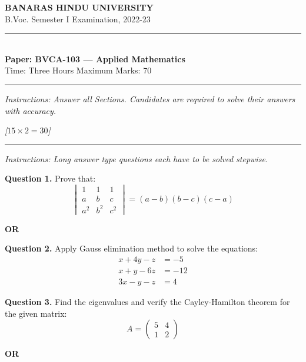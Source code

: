 \documentclass[11pt,a4paper]{article}
\newcommand{\pts}[1]{\hfill   \textit{[#1]}}
\begin{document}
\begin{center}
  {\large\bfseries BANARAS HINDU UNIVERSITY}\\[2pt]
  {\normalsize B.Voc. Semester I Examination, 2022-23}\\[6pt]
  \rule{0.8\linewidth}{0.5pt}\\[6pt]
  {\large\bfseries Paper: BVCA-103 --- Applied Mathematics}\\[4pt]
  {\normalsize Time: Three Hours \hfill Maximum Marks: 70}
\end{center}

\rule{\linewidth}{0.4pt}

\smallskip



\noindent   \textit{Instructions: Answer all Sections. Candidates are required to solve their answers with accuracy.}

\bigskip

\bigskip


\pts{$15  \times 2 = 30$}
\rule{\linewidth}{0.4pt}\smallskip




\noindent   \textit{Instructions: Long answer type questions each have to be solved stepwise.}

\medskip


\noindent   \textbf{Question 1.} Prove that:
\[

\begin{vmatrix}
  1 & 1 & 1 \\
  a & b & c \\
  a^2 & b^2 & c^2
\end{vmatrix} = (a-b)(b-c)(c-a)
\]
\centerline{   \textbf{OR}}

\medskip


\noindent   \textbf{Question 2.} Apply Gauss elimination method to solve the equations:
\[

\begin{aligned}
  x + 4y - z &= -5 \\
  x + y - 6z &= -12 \\
  3x - y - z &= 4
\end{aligned}
\]

\medskip


\noindent   \textbf{Question 3.} Find the eigenvalues and verify the Cayley-Hamilton theorem for the given matrix:
\[
A = 
\begin{pmatrix}
  5 & 4 \\
  1 & 2
\end{pmatrix}
\]
\centerline{   \textbf{OR}}
\end{document}
